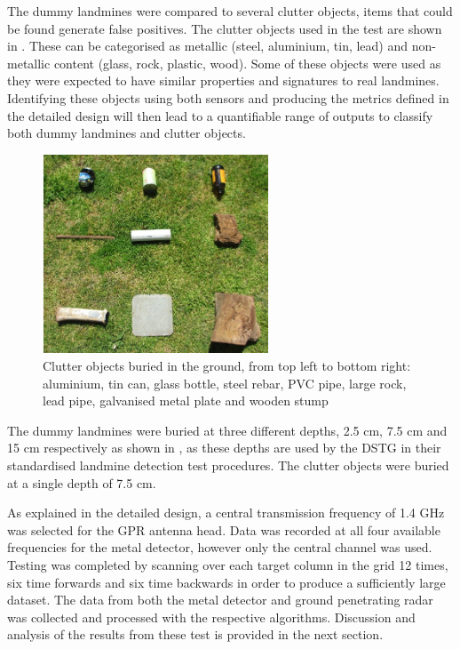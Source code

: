 \documentclass[main.tex]{subfiles}
\begin{document}
The dummy landmines were compared to several clutter objects, items that could be found generate false positives. The clutter objects used in the test are shown in . These can be categorised as metallic (steel, aluminium, tin, lead) and non-metallic content (glass, rock, plastic, wood). Some of these objects were used as they were expected to have similar properties and signatures to real landmines. Identifying these objects using both sensors and producing the metrics defined in the detailed design will then lead to a quantifiable range of outputs to classify both dummy landmines and clutter objects.

\begin{figure}[ht]
\includegraphics[width=0.6\textwidth]{5-Testing/clutter.PNG}
\centering
\caption[Clutter objects buried in the ground]{Clutter objects buried in the ground, from top left to bottom right: aluminium, tin can, glass bottle, steel rebar, PVC pipe, large rock, lead pipe, galvanised metal plate and wooden stump}
\end{figure}

The dummy landmines were buried at three different depths, 2.5 cm, 7.5 cm and 15 cm respectively as shown in , as these depths are used by the DSTG in their standardised landmine detection test procedures. The clutter objects were buried at a single depth of 7.5 cm.

As explained in the detailed design, a central transmission frequency of 1.4 GHz was selected for the GPR antenna head. Data was recorded at all four available frequencies for the metal detector, however only the central channel was used. Testing was completed by scanning over each target column in the grid 12 times, six time forwards and six time backwards in order to produce a sufficiently large dataset. The data from both the metal detector and ground penetrating radar was collected and processed with the respective algorithms. Discussion and analysis of the results from these test is provided in the next section. 
\end{document}

